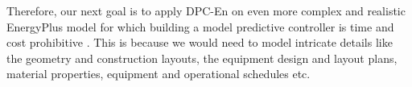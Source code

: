 Therefore, our next goal is to apply DPC-En on even more complex and realistic EnergyPlus model for which building a model predictive controller is time and cost prohibitive \cite{Sturzenegger2016}. This is because we would need to model intricate details like the geometry and construction layouts, the equipment design and layout plans, material properties, equipment and operational schedules etc.

